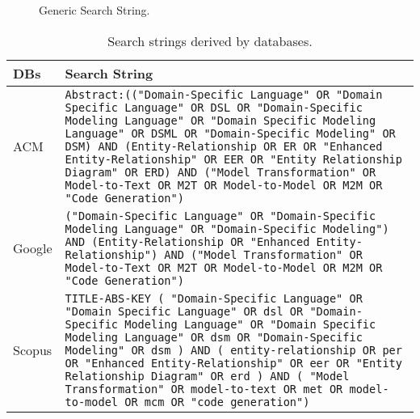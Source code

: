 \begin{figure}[htb]
\centering
\caption{Generic Search String.}
\label{fig:searchString}
\fonte{Author.}
\end{figure}


\begin{table}[!htb]
\caption{Search strings derived by databases.}
\label{tab:StringsDatabases}
\tiny
\begin{tabular}{m{1.0cm}m{14.0cm}}
\bottomrule
\textbf{DBs} & \textbf{Search String} \\
\midrule
\T ACM & \texttt{Abstract:(("Domain-Specific Language" OR "Domain Specific Language" OR DSL OR "Domain-Specific Modeling Language" OR "Domain Specific Modeling Language" OR DSML OR "Domain-Specific Modeling" OR DSM) AND (Entity-Relationship OR ER OR "Enhanced Entity-Relationship" OR EER OR "Entity Relationship Diagram" OR ERD) AND ("Model Transformation" OR Model-to-Text OR M2T OR Model-to-Model OR M2M OR "Code Generation")} \\
\midrule
\T Google & \texttt{("Domain-Specific Language" OR "Domain-Specific Modeling Language" OR "Domain-Specific Modeling") AND (Entity-Relationship OR "Enhanced Entity-Relationship") AND ("Model Transformation" OR Model-to-Text OR M2T OR Model-to-Model OR M2M OR "Code Generation")} \\
\midrule
\T Scopus & \texttt{TITLE-ABS-KEY ( "Domain-Specific Language"  OR  "Domain Specific Language"  OR  dsl  OR  "Domain-Specific Modeling Language"  OR  "Domain Specific Modeling Language"  OR  dsm  OR  "Domain-Specific Modeling"  OR  dsm )  AND  ( entity-relationship  OR  per  OR  "Enhanced Entity-Relationship"  OR  eer  OR  "Entity Relationship Diagram"  OR  erd )  AND  ( "Model Transformation"  OR  model-to-text  OR  met  OR  model-to-model  OR  mcm  OR  "code generation")} \\
\midrule

\end{tabular}
\end{table}
